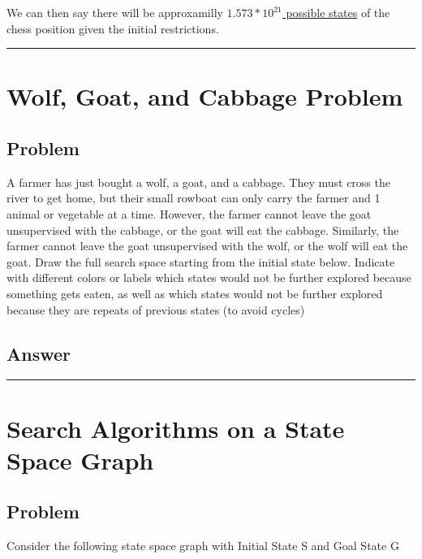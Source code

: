 \documentclass[11pt]{article}
\begin{document}
\begin{flushleft}
We can then say there will be approxamilly \ul{$1.573 * 10^{21}$ possible
states} of the chess position given the initial restrictions.


\hspace{1cm}
\hrule
\section*{Wolf, Goat, and Cabbage Problem}

\subsection*{Problem}
A farmer has just bought a wolf, a goat, and a cabbage. They must cross the
river to get home, but their small rowboat can only carry the farmer and 1
animal or vegetable at a time. However, the farmer cannot leave the goat
unsupervised with the cabbage, or the goat will eat the cabbage. Similarly,
the farmer cannot leave the goat unsupervised with the wolf, or the wolf
will eat the goat. Draw the full search space starting from the initial
state below. Indicate with different colors or labels which states would
not be further explored because something gets eaten, as well as which
states would not be further explored because they are repeats of previous
states (to avoid cycles)

\subsection*{Answer}

\hspace{1cm}
\hrule
\section*{Search Algorithms on a State Space Graph}

\subsection*{Problem}
Consider the following state space graph with Initial State S and Goal State G


\end{flushleft}
\end{document}

